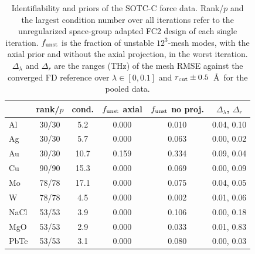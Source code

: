 \begin{table}[t]
\caption{Identifiability and priors of the SOTC-C force data. Rank/$p$ and the largest condition number over all iterations refer to the unregularized space-group adapted FC2 design of each single iteration. $f_{\rm unst}$ is the fraction of unstable $12^3$-mesh modes, with the axial prior and without the axial projection, in the worst iteration. $\Delta_\lambda$ and $\Delta_r$ are the ranges (THz) of the mesh RMSE against the converged FD reference over $\lambda\in[0,0.1]$ and $r_{\rm cut}\pm0.5$~\AA\ for the pooled data.}
\label{tab:audit}
\begin{ruledtabular}
\begin{tabular}{lccccc}
 & rank/$p$ & cond. & $f_{\rm unst}$ axial & $f_{\rm unst}$ no proj. & $\Delta_\lambda$, $\Delta_r$\\
\hline
Al & 30/30 & 5.2 & 0.000 & 0.010 & 0.04, 0.10\\
Ag & 30/30 & 5.7 & 0.000 & 0.063 & 0.00, 0.02\\
Au & 30/30 & 10.7 & 0.159 & 0.334 & 0.09, 0.04\\
Cu & 90/90 & 15.3 & 0.000 & 0.069 & 0.00, 0.09\\
Mo & 78/78 & 17.1 & 0.000 & 0.075 & 0.04, 0.05\\
W & 78/78 & 4.5 & 0.000 & 0.002 & 0.01, 0.06\\
NaCl & 53/53 & 3.9 & 0.000 & 0.106 & 0.00, 0.18\\
MgO & 53/53 & 2.9 & 0.000 & 0.033 & 0.01, 0.83\\
PbTe & 53/53 & 3.1 & 0.000 & 0.080 & 0.00, 0.03\\
\end{tabular}
\end{ruledtabular}
\end{table}
